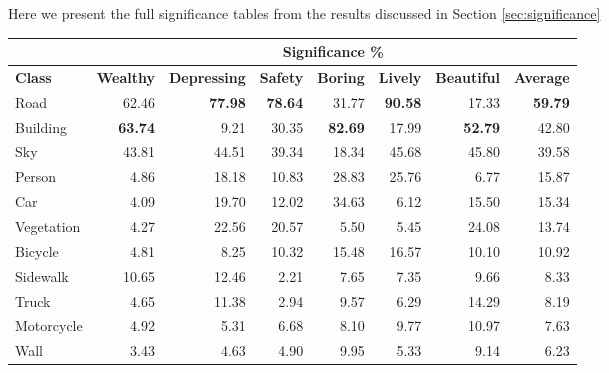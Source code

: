 Here we present the full significance tables from the results discussed in Section \ref{sec:significance}

\begin{table}[H]
	\begin{tabular}{|l|rrrrrrr|}
		\hline
					& \multicolumn{7}{c|}{\textbf{Significance \%}}   \\ \hline
		\textbf{Class}         & \textbf{Wealthy}        & \textbf{Depressing}     & \textbf{Safety}         & \textbf{Boring}         & \textbf{Lively}         & \textbf{Beautiful}      & \textbf{Average}        \\
		\hline
		Road          & 62.46          & \textbf{77.98} & \textbf{78.64} & 31.77          & \textbf{90.58} & 17.33        & \textbf{59.79} \\
		Building      & \textbf{63.74} & 9.21           & 30.35          & \textbf{82.69} & 17.99          & \textbf{52.79} & 42.80          \\
		Sky           & 43.81          & 44.51          & 39.34          & 18.34          & 45.68          & 45.80          & 39.58          \\
		Person        & 4.86           & 18.18          & 10.83          & 28.83          & 25.76          & 6.77           & 15.87          \\
		Car           & 4.09           & 19.70          & 12.02          & 34.63          & 6.12           & 15.50          & 15.34          \\
		Vegetation    & 4.27           & 22.56          & 20.57          & 5.50           & 5.45           & 24.08          & 13.74          \\
		Bicycle       & 4.81           & 8.25           & 10.32          & 15.48          & 16.57          & 10.10          & 10.92          \\
		Sidewalk      & 10.65          & 12.46          & 2.21           & 7.65           & 7.35           & 9.66           & 8.33           \\
		Truck         & 4.65           & 11.38          & 2.94           & 9.57           & 6.29           & 14.29          & 8.19           \\
		Motorcycle    & 4.92           & 5.31           & 6.68           & 8.10           & 9.77           & 10.97          & 7.63           \\
		Wall          & 3.43           & 4.63           & 4.90           & 9.95           & 5.33           & 9.14           & 6.23           \\

\end{tabular}
\end{table}
